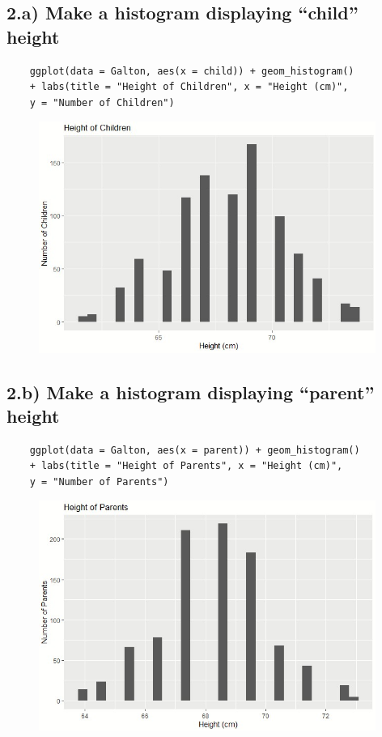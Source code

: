 \documentclass[11pt]{article}
\begin{document}
\subsection*{2.a) Make a histogram displaying “child” height}
\begin{verbatim}
    ggplot(data = Galton, aes(x = child)) + geom_histogram() 
    + labs(title = "Height of Children", x = "Height (cm)", 
    y = "Number of Children")
\end{verbatim}

\begin{figure}[H]
\includegraphics[width = 11cm]{2a.jpg}
\centering
\end{figure}

\subsection*{2.b) Make a histogram displaying “parent” height}
\begin{verbatim}
    ggplot(data = Galton, aes(x = parent)) + geom_histogram() 
    + labs(title = "Height of Parents", x = "Height (cm)",
    y = "Number of Parents")
\end{verbatim}

\begin{figure}[H]
\includegraphics[width = 11cm]{2b.jpg}
\centering
\end{figure}
\end{document}
